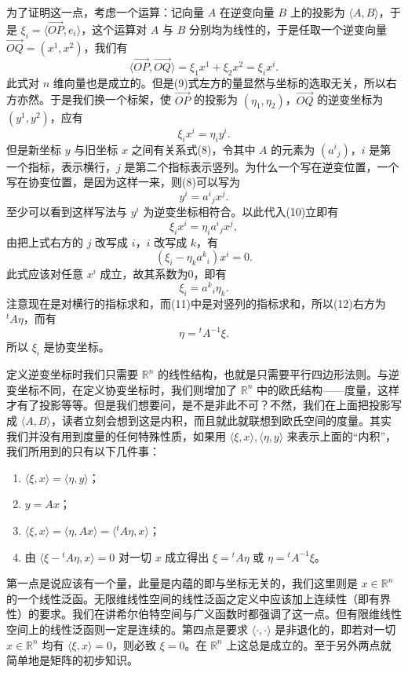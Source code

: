为了证明这一点，考虑一个运算：记向量 $A$ 在逆变向量 $B$ 上的投影为 $\langle A,B\rangle$，于是 $\xi_i=\langle\overrightarrow{OP},e_i\rangle$，这个运算对 $A$ 与 $B$ 分别均为线性的，于是任取一个逆变向量 $\overrightarrow{OQ}=(x^1,x^2)$，我们有
\begin{equation}
 \langle\overrightarrow{OP},\overrightarrow{OQ}\rangle
 =\xi_1x^1+\xi_2x^2=\xi_i x^i.
 \tag{9}
\end{equation}
此式对 $n$ 维向量也是成立的。但是(9)式左方的量显然与坐标的选取无关，所以右方亦然。于是我们换一个标架，使 $\overrightarrow{OP}$ 的投影为 $(\eta_1,\eta_2)$，$\overrightarrow{OQ}$ 的逆变坐标为 $(y^1,y^2)$，应有
\begin{equation}
 \xi_i x^i=\eta_i y^i.
 \tag{10}
\end{equation}
但是新坐标 $y$ 与旧坐标 $x$ 之间有关系式(8)，令其中 $A$ 的元素为 $(a^i{}_j)$，$i$ 是第一个指标，表示横行，$j$ 是第二个指标表示竖列。为什么一个写在逆变位置，一个写在协变位置，是因为这样一来，则(8)可以写为
\begin{equation}
 y^i=a^i{}_j x^j.
 \tag{11}
\end{equation}
至少可以看到这样写法与 $y^i$ 为逆变坐标相符合。以此代入(10)立即有
\[
 \xi_i x^i=\eta_i a^i{}_j x^j,
\]
由把上式右方的 $j$ 改写成 $i$，$i$ 改写成 $k$，有
\[
 (\xi_i-\eta_k a^k{}_i)x^i=0.
\]
此式应该对任意 $x^i$ 成立，故其系数为0，即有
\begin{equation}
 \xi_i=a^k{}_i\eta_k.
 \tag{12}
\end{equation}
注意现在是对横行的指标求和，而(11)中是对竖列的指标求和，所以(12)右方为 ${}^{t}\!A\eta$，而有
\begin{equation}
 \eta={}^{t}\!A^{-1}\xi.
 \tag{13}
\end{equation}
所以 $\xi_i$ 是协变坐标。

定义逆变坐标时我们只需要 $\mathbb R^n$ 的线性结构，也就是只需要平行四边形法则。与逆变坐标不同，在定义协变坐标时，我们则增加了 $\mathbb R^n$ 中的欧氏结构——度量，这样才有了投影等等。但是我们想要问，是不是非此不可？不然，我们在上面把投影写成 $\langle A,B\rangle$，读者立刻会想到这是内积，而且就此就联想到欧氏空间的度量。其实我们并没有用到度量的任何特殊性质，如果用 $\langle\xi,x\rangle,\langle\eta,y\rangle$ 来表示上面的“内积”，我们所用到的只有以下几件事：
\begin{enumerate}[label=\arabic*.,leftmargin=2.8em]
\item $\langle\xi,x\rangle=\langle\eta,y\rangle$；
\item $y=Ax$；
\item $\langle\xi,x\rangle=\langle\eta,Ax\rangle=\langle{}^{t}\!A\eta,x\rangle$；
\item 由 $\langle\xi-{}^{t}\!A\eta,x\rangle=0$ 对一切 $x$ 成立得出 $\xi={}^t\!A\eta$ 或 $\eta={}^t\!A^{-1}\xi$。
\end{enumerate}
第一点是说应该有一个量，此量是内蕴的即与坐标无关的，我们这里则是 $x\in\mathbb R^n$ 的一个线性泛函。无限维线性空间的线性泛函之定义中应该加上连续性（即有界性）的要求。我们在讲希尔伯特空间与广义函数时都强调了这一点。但有限维线性空间上的线性泛函则一定是连续的。第四点是要求 $\langle\cdot,\cdot\rangle$ 是非退化的，即若对一切 $x\in\mathbb R^n$ 均有 $\langle\xi,x\rangle=0$，则必致 $\xi=0$。在 $\mathbb R^n$ 上这总是成立的。至于另外两点就简单地是矩阵的初步知识。

